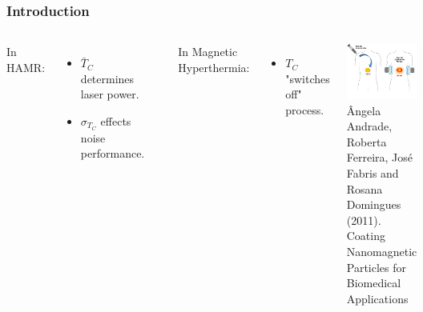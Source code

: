 \documentclass{beamer}
\begin{document}
\begin{frame}
	\frametitle{Introduction}
	\begin{columns}
		\column{6cm}
		In HAMR\footnotemark[1]:
		\begin{itemize}
			\item{$\bar{T}_C$ determines laser power.}
			\item{$\sigma_{T_C}$ effects noise performance.}
		\end{itemize} \vspace{1mm}
		
		\begin{center}
		\includegraphics[width=4cm]{Images/Anisotropy} \\ \vspace{3mm}
		\end{center}
		
		\column{6cm}
		In Magnetic Hyperthermia\footnotemark[2]:
		\begin{itemize}
		\item{$T_C$ "switches off" process.}
		\end{itemize} \vspace{3mm}
		
		\begin{center}
		\includegraphics[width=4cm]{Images/person} \\
		\tiny \^{A}ngela Andrade, Roberta Ferreira, Jos\'{e} Fabris and Rosana Domingues (2011). Coating Nanomagnetic Particles for Biomedical Applications
		\end{center}
	\end{columns}
\end{frame}
\end{document}
